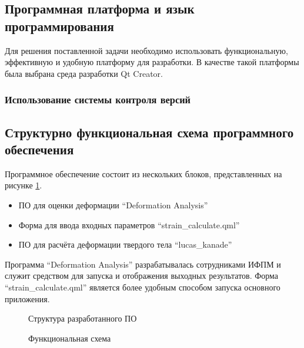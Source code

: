 \subsection {Программная платформа и язык программирования}
Для решения поставленной задачи необходимо использовать функциональную, эффективную и удобную платформу для разработки. В качестве такой платформы была выбрана среда разработки Qt Creator.

\subsubsection {Использование системы контроля версий}

\subsection{Структурно функциональная схема программного обеспечения}%

Программное обеспечение состоит из нескольких блоков, представленных на рисунке \ref{pic:shema_PO}.

\begin{itemize}
\item ПО для оценки деформации ``Deformation Analysis''
\item Форма для ввода входных параметров ``strain\_calculate.qml''
\item ПО для расчёта деформации твердого тела ``lucas\_kanade''
\end{itemize}

Программа ``Deformation Analysis'' разрабатывалась сотрудниками ИФПМ и служит средством для запуска и отображения выходных результатов. Форма ``strain\_calculate.qml'' является более удобным способом запуска основного приложения. 

\begin{figure}[ht]
\caption{Структура разработанного ПО}
\label{pic:shema_PO}
\end{figure}

\begin{figure}[ht]
\caption{Функциональная схема}
\label{pic:idef0}
\end{figure}

